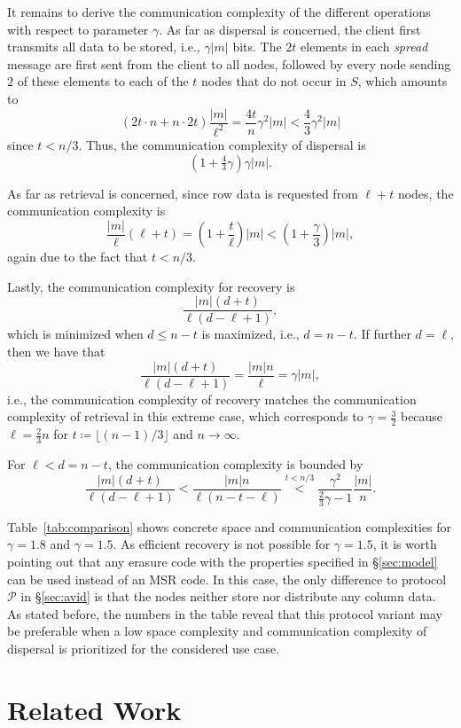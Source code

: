 \documentclass[sigconf,screen]{acmart}
\begin{document}
It remains to derive the communication complexity of the different operations with respect to parameter $\gamma$.
As far as dispersal is concerned, the client first transmits all data to be stored, i.e., $\gamma|m|$ bits. The $2t$ elements in each \emph{spread} message are first sent from the client to all nodes, followed by every node sending $2$ of these elements to each of the $t$ nodes that do not occur in $S$, which amounts to
$$(2t \cdot n + n \cdot 2t)\frac{|m|}{\ell^2} = \frac{4t}{n}\gamma^2|m| < \frac{4}{3}\gamma^2|m|$$ since $t < n/3$.
Thus, the communication complexity of dispersal is $$\left(1 + \tfrac{4}{3}\gamma\right)\gamma|m|.$$

As far as retrieval is concerned, since row data is requested from $\ell + t$ nodes, the communication complexity is
$$\frac{|m|}{\ell}(\ell+t) = \left(1 + \frac{t}{\ell}\right)|m| < \left(1+\frac{\gamma}{3}\right)|m|,$$ again due to the fact that $t < n/3$.

Lastly, the communication complexity for recovery is $$\frac{|m|(d+t)}{\ell(d-\ell+1)},$$ which is minimized when $d \le n-t$ is maximized, i.e., $d = n-t$.
If further $d = \ell$, then we have that
$$\frac{|m|(d+t)}{\ell(d-\ell+1)} = \frac{|m|n}{\ell} = \gamma|m|,$$
i.e., the communication complexity of recovery matches the communication complexity of retrieval in this extreme case, which corresponds to $\gamma = \frac{3}{2}$ because $\ell = \frac{2}{3}n$ for $t \coloneqq \lfloor(n-1)/3\rfloor$ and $n \rightarrow \infty$.

For $\ell < d = n-t$, the communication complexity is bounded by
 $$\frac{|m|(d+t)}{\ell(d-\ell+1)} < \frac{|m|n}{\ell(n-t-\ell)}  \stackrel{t < n/3}{<} \frac{\gamma^2}{\frac{2}{3}\gamma - 1}\frac{|m|}{n}.$$
 
Table~\ref{tab:comparison} shows concrete space and communication complexities for $\gamma = 1.8$ and $\gamma =  1.5$. 
As efficient recovery is not possible for $\gamma =  1.5$, it is worth pointing out that any erasure code
with the properties specified in \S\ref{sec:model}
 can be used instead of an MSR code. In this case, the only difference to protocol $\mathcal{P}$ in \S\ref{sec:avid} is that the nodes neither store nor distribute any column data.
As stated before, the numbers in the table reveal that this protocol variant may be preferable when a low space complexity and communication complexity of dispersal is prioritized for the considered use case.


\section{Related Work}
\label{sec:related_work}
\end{document}
